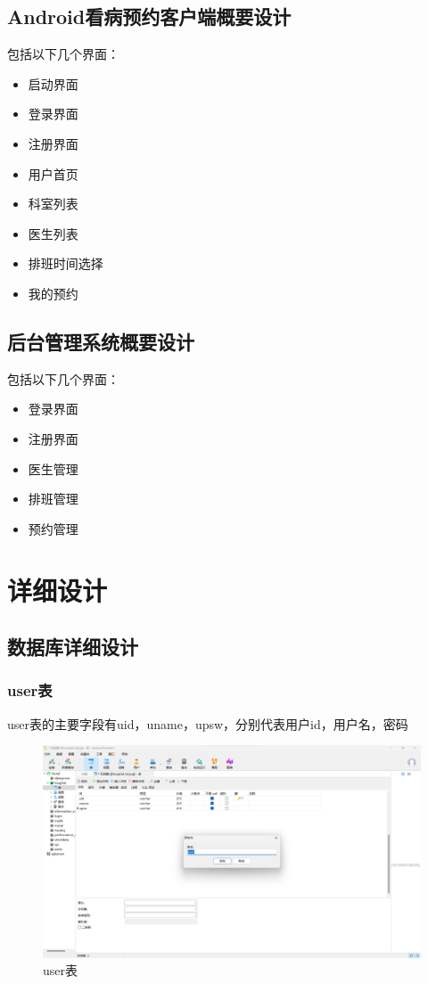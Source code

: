 \documentclass[UTF8,12pt]{article}
\begin{document}
\subsection{Android看病预约客户端概要设计}
包括以下几个界面：
\begin{itemize}
    \item 启动界面
    \item 登录界面
    \item 注册界面
    \item 用户首页
    \item 科室列表
    \item 医生列表
    \item 排班时间选择
    \item 我的预约
\end{itemize}

\subsection{后台管理系统概要设计}
包括以下几个界面：
\begin{itemize}
    \item 登录界面
    \item 注册界面
    \item 医生管理
    \item 排班管理
    \item 预约管理
\end{itemize}

\newpage

\section{详细设计}

\subsection{数据库详细设计}

\subsubsection{user表}
user表的主要字段有uid，uname，upsw，分别代表用户id，用户名，密码

\begin{figure}[htbp]
    \centering
    \includegraphics[width=1.0\textwidth]{imgs/5.png}
    \caption{user表}
\end{figure}
\end{document}
